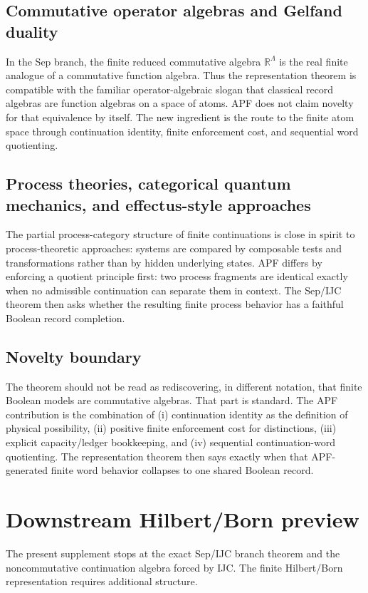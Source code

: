 \documentclass[11pt]{article}
\newcommand{\R}{\mathbb R}
\begin{document}
\subsection*{Commutative operator algebras and Gelfand duality}
In the Sep branch, the finite reduced commutative algebra $\R^\Lambda$ is the real finite analogue of a commutative function algebra.  Thus the representation theorem is compatible with the familiar operator-algebraic slogan that classical record algebras are function algebras on a space of atoms.  APF does not claim novelty for that equivalence by itself.  The new ingredient is the route to the finite atom space through continuation identity, finite enforcement cost, and sequential word quotienting.

\subsection*{Process theories, categorical quantum mechanics, and effectus-style approaches}
The partial process-category structure of finite continuations is close in spirit to process-theoretic approaches: systems are compared by composable tests and transformations rather than by hidden underlying states.  APF differs by enforcing a quotient principle first: two process fragments are identical exactly when no admissible continuation can separate them in context.  The Sep/IJC theorem then asks whether the resulting finite process behavior has a faithful Boolean record completion.

\subsection*{Novelty boundary}
The theorem should not be read as rediscovering, in different notation, that finite Boolean models are commutative algebras.  That part is standard.  The APF contribution is the combination of (i) continuation identity as the definition of physical possibility, (ii) positive finite enforcement cost for distinctions, (iii) explicit capacity/ledger bookkeeping, and (iv) sequential continuation-word quotienting.  The representation theorem then says exactly when that APF-generated finite word behavior collapses to one shared Boolean record.
\section{Downstream Hilbert/Born preview}\label{sec:downstream-hilbert-born-preview}

The present supplement stops at the exact Sep/IJC branch theorem and the noncommutative continuation algebra forced by IJC.  The finite Hilbert/Born representation requires additional structure.
\end{document}
